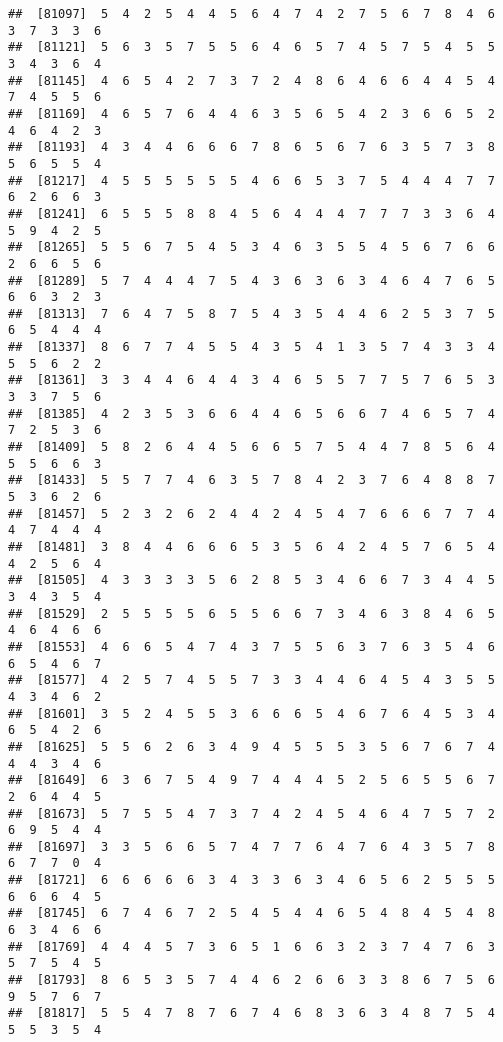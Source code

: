\documentclass[
]{book}
\begin{document}
\begin{verbatim}
##  [81097]  5  4  2  5  4  4  5  6  4  7  4  2  7  5  6  7  8  4  6  3  7  3  3  6
##  [81121]  5  6  3  5  7  5  5  6  4  6  5  7  4  5  7  5  4  5  5  3  4  3  6  4
##  [81145]  4  6  5  4  2  7  3  7  2  4  8  6  4  6  6  4  4  5  4  7  4  5  5  6
##  [81169]  4  6  5  7  6  4  4  6  3  5  6  5  4  2  3  6  6  5  2  4  6  4  2  3
##  [81193]  4  3  4  4  6  6  6  7  8  6  5  6  7  6  3  5  7  3  8  5  6  5  5  4
##  [81217]  4  5  5  5  5  5  5  4  6  6  5  3  7  5  4  4  4  7  7  6  2  6  6  3
##  [81241]  6  5  5  5  8  8  4  5  6  4  4  4  7  7  7  3  3  6  4  5  9  4  2  5
##  [81265]  5  5  6  7  5  4  5  3  4  6  3  5  5  4  5  6  7  6  6  2  6  6  5  6
##  [81289]  5  7  4  4  4  7  5  4  3  6  3  6  3  4  6  4  7  6  5  6  6  3  2  3
##  [81313]  7  6  4  7  5  8  7  5  4  3  5  4  4  6  2  5  3  7  5  6  5  4  4  4
##  [81337]  8  6  7  7  4  5  5  4  3  5  4  1  3  5  7  4  3  3  4  5  5  6  2  2
##  [81361]  3  3  4  4  6  4  4  3  4  6  5  5  7  7  5  7  6  5  3  3  3  7  5  6
##  [81385]  4  2  3  5  3  6  6  4  4  6  5  6  6  7  4  6  5  7  4  7  2  5  3  6
##  [81409]  5  8  2  6  4  4  5  6  6  5  7  5  4  4  7  8  5  6  4  5  5  6  6  3
##  [81433]  5  5  7  7  4  6  3  5  7  8  4  2  3  7  6  4  8  8  7  5  3  6  2  6
##  [81457]  5  2  3  2  6  2  4  4  2  4  5  4  7  6  6  6  7  7  4  4  7  4  4  4
##  [81481]  3  8  4  4  6  6  6  5  3  5  6  4  2  4  5  7  6  5  4  4  2  5  6  4
##  [81505]  4  3  3  3  3  5  6  2  8  5  3  4  6  6  7  3  4  4  5  3  4  3  5  4
##  [81529]  2  5  5  5  5  6  5  5  6  6  7  3  4  6  3  8  4  6  5  4  6  4  6  6
##  [81553]  4  6  6  5  4  7  4  3  7  5  5  6  3  7  6  3  5  4  6  6  5  4  6  7
##  [81577]  4  2  5  7  4  5  5  7  3  3  4  4  6  4  5  4  3  5  5  4  3  4  6  2
##  [81601]  3  5  2  4  5  5  3  6  6  6  5  4  6  7  6  4  5  3  4  6  5  4  2  6
##  [81625]  5  5  6  2  6  3  4  9  4  5  5  5  3  5  6  7  6  7  4  4  4  3  4  6
##  [81649]  6  3  6  7  5  4  9  7  4  4  4  5  2  5  6  5  5  6  7  2  6  4  4  5
##  [81673]  5  7  5  5  4  7  3  7  4  2  4  5  4  6  4  7  5  7  2  6  9  5  4  4
##  [81697]  3  3  5  6  6  5  7  4  7  7  6  4  7  6  4  3  5  7  8  6  7  7  0  4
##  [81721]  6  6  6  6  6  3  4  3  3  6  3  4  6  5  6  2  5  5  5  6  6  6  4  5
##  [81745]  6  7  4  6  7  2  5  4  5  4  4  6  5  4  8  4  5  4  8  6  3  4  6  6
##  [81769]  4  4  4  5  7  3  6  5  1  6  6  3  2  3  7  4  7  6  3  5  7  5  4  5
##  [81793]  8  6  5  3  5  7  4  4  6  2  6  6  3  3  8  6  7  5  6  9  5  7  6  7
##  [81817]  5  5  4  7  8  7  6  7  4  6  8  3  6  3  4  8  7  5  4  5  5  3  5  4

\end{verbatim}
\end{document}
